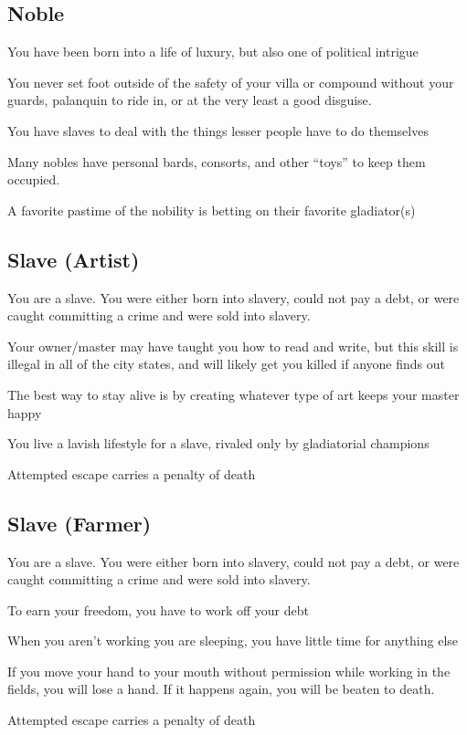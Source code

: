 \subsection{Noble}

\begin{description}
    \item You have been born into a life of luxury, but also one of political intrigue
    \item You never set foot outside of the safety of your villa or compound without your guards, palanquin to ride in, or at the very least a good disguise.
    \item You have slaves to deal with the things lesser people have to do themselves
    \item Many nobles have personal bards, consorts, and other “toys” to keep them occupied.
    \item A favorite pastime of the nobility is betting on their favorite gladiator(s)
\end{description}

\subsection{Slave (Artist)}

\begin{description}
    \item You are a slave. You were either born into slavery, could not pay a debt, or were caught committing a crime and were sold into slavery.
    \item Your owner/master may have taught you how to read and write, but this skill is illegal in all of the city states, and will likely get you killed if anyone finds out
    \item The best way to stay alive is by creating whatever type of art keeps your master happy
    \item You live a lavish lifestyle for a slave, rivaled only by gladiatorial champions
    \item Attempted escape carries a penalty of death
\end{description}

\subsection{Slave (Farmer)}

\begin{description}
    \item You are a slave. You were either born into slavery, could not pay a debt, or were caught committing a crime and were sold into slavery.
    \item To earn your freedom, you have to work off your debt
    \item When you aren’t working you are sleeping, you have little time for anything else
    \item If you move your hand to your mouth without permission while working in the fields, you will lose a hand. If it happens again, you will be beaten to death.
    \item Attempted escape carries a penalty of death
\end{description}

